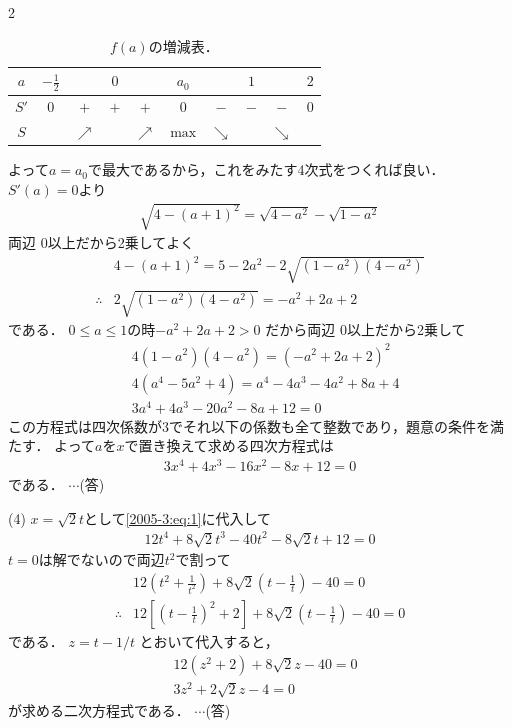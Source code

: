 \documentclass[../../../../main.tex]{subfiles}
\begin{document}
\begin{multicols}{2}
  \begin{table}[H]
    \centering
    \caption{$f(a)$の増減表．}
    \label{2005-3:table:1}
    \begin{tabular}{|c|c|c|c|c|c|c|c|c|c|}
      \hline
      $a$  & $-\frac{1}{2}$ &            & $0$ &            & $a_0$        &            & $1$ &            & $2$ \\
      \hline
      $S'$ & $0$            & $+$        & $+$ & $+$        & $0$          & $-$        & $-$ & $-$        & $0$ \\
      \hline
      $S$  &                & $\nearrow$ &     & $\nearrow$ & $\text{max}$ & $\searrow$ &     & $\searrow$ &     \\
      \hline
    \end{tabular}
  \end{table}

  よって$a=a_0$で最大であるから，これをみたす4次式をつくれば良い．
  $S'(a)=0$より
  \begin{align*}
    \sqrt{4-(a+1)^2} = \sqrt{4-a^2} - \sqrt{1-a^2}
  \end{align*}
  両辺 $0$以上だから2乗してよく
  \begin{align*}
     & 4-(a+1)^2 = 5-2a^2 - 2\sqrt{(1-a^2)(4-a^2)} \\
    \therefore
     & 2\sqrt{(1-a^2)(4-a^2)} = -a^2+2a+2
  \end{align*}
  である．
  $0\le a \le 1$の時$-a^2+2a+2>0$ だから両辺 $0$以上だから2乗して
  \begin{align*}
     & 4(1-a^2)(4-a^2) = (-a^2+2a+2)^2    \\
     & 4(a^4-5a^2+4) = a^4-4a^3-4a^2+8a+4 \\
     & 3a^4+4a^3-20a^2-8a+12=0
  \end{align*}
  この方程式は四次係数が$3$でそれ以下の係数も全て整数であり，題意の条件を満たす．
  よって$a$を$x$で置き換えて求める四次方程式は
  \begin{align}
    3x^4+4x^3-16x^2-8x+12=0 \label{2005-3:eq:1}
  \end{align}
  である．  $\cdots$(答)

  \vspace{10pt}
  (4)
  $x = \sqrt{2}t$として\cref{2005-3:eq:1}に代入して
  \begin{align*}
    12t^4 + 8\sqrt{2}t^3 - 40t^2 - 8\sqrt{2}t + 12 = 0
  \end{align*}
  $t=0$は解でないので両辺$t^2$で割って
  \begin{align*}
     & 12\left(t^2+\frac{1}{t^2}\right) + 8\sqrt{2}\left(t-\frac{1}{t}\right) - 40 = 0              \\
    \therefore
     & 12\left[\left(t-\frac{1}{t}\right)^2+2\right] + 8\sqrt{2}\left(t-\frac{1}{t}\right) - 40 = 0
  \end{align*}
  である．
  $ z = t-1/t$ とおいて代入すると，
  \begin{align}
     & 12(z^2+2) + 8\sqrt{2}z - 40 = 0               \\
     & 3z^2 + 2\sqrt{2}z - 4 = 0 \label{2005-3:eq:2}
  \end{align}
  が求める二次方程式である． $\cdots$(答)


\end{multicols}
\end{document}
